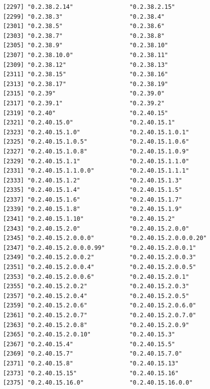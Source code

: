 \documentclass[
  letterpaper,
  DIV=11,
  numbers=noendperiod]{scrreprt}
\begin{document}
\begin{verbatim}
[2297] "0.2.38.2.14"                "0.2.38.2.15"               
[2299] "0.2.38.3"                   "0.2.38.4"                  
[2301] "0.2.38.5"                   "0.2.38.6"                  
[2303] "0.2.38.7"                   "0.2.38.8"                  
[2305] "0.2.38.9"                   "0.2.38.10"                 
[2307] "0.2.38.10.0"                "0.2.38.11"                 
[2309] "0.2.38.12"                  "0.2.38.13"                 
[2311] "0.2.38.15"                  "0.2.38.16"                 
[2313] "0.2.38.17"                  "0.2.38.19"                 
[2315] "0.2.39"                     "0.2.39.0"                  
[2317] "0.2.39.1"                   "0.2.39.2"                  
[2319] "0.2.40"                     "0.2.40.15"                 
[2321] "0.2.40.15.0"                "0.2.40.15.1"               
[2323] "0.2.40.15.1.0"              "0.2.40.15.1.0.1"           
[2325] "0.2.40.15.1.0.5"            "0.2.40.15.1.0.6"           
[2327] "0.2.40.15.1.0.8"            "0.2.40.15.1.0.9"           
[2329] "0.2.40.15.1.1"              "0.2.40.15.1.1.0"           
[2331] "0.2.40.15.1.1.0.0"          "0.2.40.15.1.1.1"           
[2333] "0.2.40.15.1.2"              "0.2.40.15.1.3"             
[2335] "0.2.40.15.1.4"              "0.2.40.15.1.5"             
[2337] "0.2.40.15.1.6"              "0.2.40.15.1.7"             
[2339] "0.2.40.15.1.8"              "0.2.40.15.1.9"             
[2341] "0.2.40.15.1.10"             "0.2.40.15.2"               
[2343] "0.2.40.15.2.0"              "0.2.40.15.2.0.0"           
[2345] "0.2.40.15.2.0.0.0"          "0.2.40.15.2.0.0.0.20"      
[2347] "0.2.40.15.2.0.0.0.99"       "0.2.40.15.2.0.0.1"         
[2349] "0.2.40.15.2.0.0.2"          "0.2.40.15.2.0.0.3"         
[2351] "0.2.40.15.2.0.0.4"          "0.2.40.15.2.0.0.5"         
[2353] "0.2.40.15.2.0.0.6"          "0.2.40.15.2.0.1"           
[2355] "0.2.40.15.2.0.2"            "0.2.40.15.2.0.3"           
[2357] "0.2.40.15.2.0.4"            "0.2.40.15.2.0.5"           
[2359] "0.2.40.15.2.0.6"            "0.2.40.15.2.0.6.0"         
[2361] "0.2.40.15.2.0.7"            "0.2.40.15.2.0.7.0"         
[2363] "0.2.40.15.2.0.8"            "0.2.40.15.2.0.9"           
[2365] "0.2.40.15.2.0.10"           "0.2.40.15.3"               
[2367] "0.2.40.15.4"                "0.2.40.15.5"               
[2369] "0.2.40.15.7"                "0.2.40.15.7.0"             
[2371] "0.2.40.15.8"                "0.2.40.15.13"              
[2373] "0.2.40.15.15"               "0.2.40.15.16"              
[2375] "0.2.40.15.16.0"             "0.2.40.15.16.0.0"          

\end{verbatim}
\end{document}
